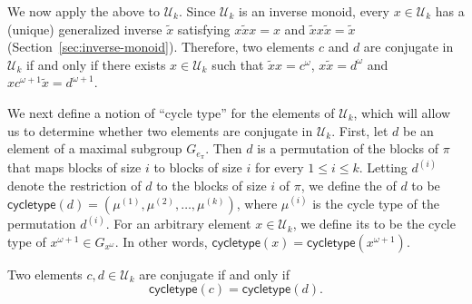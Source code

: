 We now apply the above to $\mathcal{U}_k$.
Since $\mathcal{U}_k$ is an inverse monoid, every
$x\in \mathcal{U}_k$ has a (unique) generalized inverse $\widetilde{x}$
satisfying $x\widetilde{x}x = x$ and $\widetilde{x}x\widetilde{x}
= \widetilde{x}$ (\cf Section~\ref{sec:inverse-monoid}).
Therefore, two elements $c$ and $d$ are conjugate in $\mathcal{U}_k$ if and only if there
exists $x \in \mathcal{U}_k$ such that
$\widetilde{x}x = c^{\omega}$,
$x \widetilde{x} = d^{\omega}$
and $x c^{\omega +1} \widetilde{x} = d^{\omega + 1}$.

We next define a notion of ``cycle type'' for the elements of $\mathcal{U}_k$,
which will allow us to determine whether two elements are conjugate in $\mathcal{U}_k$.
First, let $d$ be an element of a maximal subgroup $G_{e_\pi}$.
Then $d$ is a permutation of the blocks of $\pi$ that maps blocks of size $i$
to blocks of size $i$ for every $1 \leqslant i \leqslant k$.
Letting $d^{(i)}$ denote the restriction of $d$ to the blocks of size $i$ of $\pi$,
we define the  of $d$ to be $\mathsf{cycletype}(d) = (\mu^{(1)}, \mu^{(2)}, \ldots, \mu^{(k)})$,
where $\mu^{(i)}$ is the cycle type of the permutation $d^{(i)}$.
For an arbitrary element $x \in \mathcal{U}_k$, we define its
 to be the cycle type of $x^{\omega +1} \in G_{x^\omega}$.
In other words, $\mathsf{cycletype}(x) = \mathsf{cycletype}(x^{\omega + 1})$.

\begin{prop}\label{prop:conjugacyclasses}
    Two elements $c, d \in \mathcal{U}_k$ are conjugate if and only if
    \[
        \mathsf{cycletype}(c) = \mathsf{cycletype}(d).
    \]
\end{prop}

